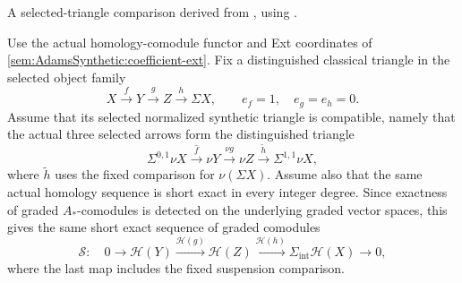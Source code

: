 \begin{theorem}
\label{sem:Literature:first-quotient-ext-boundary}
A selected-triangle comparison derived from
\cite[Theorem 9.12(5) and Corollary 9.13]{BHS}, using
\cite[Lemma 4.29, Theorem 4.54 and Lemma 4.56]{Pst}.\par
Use the actual homology-comodule functor and Ext coordinates of
\ref{sem:AdamsSynthetic:coefficient-ext}. Fix a distinguished classical
triangle in the selected object family
\[
X\xrightarrow fY\xrightarrow gZ\xrightarrow h\Sigma X,
\qquad e_f=1,\quad e_g=e_h=0.
\]
Assume that its selected normalized synthetic triangle is compatible,
namely that the actual three selected arrows form the distinguished
triangle
\[
\Sigma^{0,1}\nu X\xrightarrow{\widehat f}\nu Y
\xrightarrow{\nu g}\nu Z\xrightarrow{\widetilde h}
\Sigma^{1,1}\nu X,
\]
where $\widetilde h$ uses the fixed comparison for $\nu(\Sigma X)$.
Assume also that the same actual homology sequence is short exact in
every integer degree. Since exactness of graded $A_*$-comodules is
detected on the underlying graded vector spaces, this gives the same
short exact sequence of graded comodules
\[
\mathcal S:\quad
0\longrightarrow\mathcal H(Y)\xrightarrow{\mathcal H(g)}
\mathcal H(Z)\xrightarrow{\mathcal H(h)}
\Sigma_{\mathrm{int}}\mathcal H(X)\longrightarrow0,
\]
where the last map includes the fixed suspension comparison.


\end{theorem}
